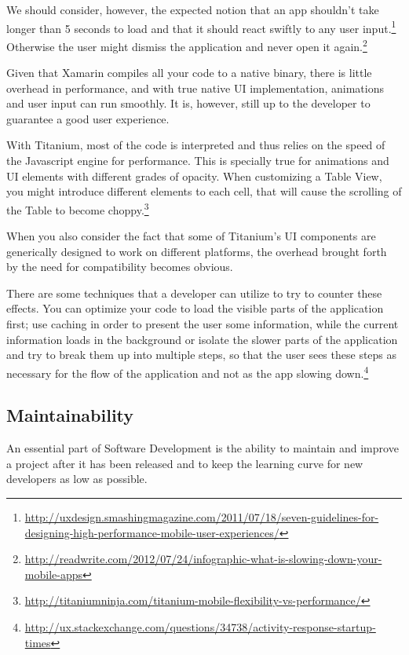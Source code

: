 We should consider, however, the expected notion that an app shouldn't take longer than 5 seconds to load and that it should react swiftly to any user input.\footnote{\url{http://uxdesign.smashingmagazine.com/2011/07/18/seven-guidelines-for-designing-high-performance-mobile-user-experiences/}} Otherwise the user might dismiss the application and never open it again.\footnote{\url{http://readwrite.com/2012/07/24/infographic-what-is-slowing-down-your-mobile-apps}}

Given that Xamarin compiles all your code to a native binary, there is little overhead in performance, and with true native \ac{UI} implementation, animations and user input can run smoothly. It is, however, still up to the developer to guarantee a good user experience. 

With Titanium, most of the code is interpreted and thus relies on the speed of the Javascript engine for performance. This is specially true for animations and \ac{UI} elements with different grades of opacity. When customizing a Table View, you might introduce different elements to each cell, that will cause the scrolling of the Table to become choppy.\footnote{\url{http://titaniumninja.com/titanium-mobile-flexibility-vs-performance/}}

When you also consider the fact that some of Titanium's \ac{UI} components are generically designed to work on different platforms, the overhead brought forth by the need for compatibility becomes obvious.

There are some techniques that a developer can utilize to try to counter these effects. You can optimize your code to load the visible parts of the application first; use caching in order to present the user some information, while the current information loads in the background or isolate the slower parts of the application and try to break them up into multiple steps, so that the user sees these steps as necessary for the flow of the application and not as the app slowing down.\footnote{\url{http://ux.stackexchange.com/questions/34738/activity-response-startup-times}}
  

   
\subsection{Maintainability}
An essential part of Software Development is the ability to maintain and improve a project after it has been released and to keep the learning curve for new developers as low as possible. 

